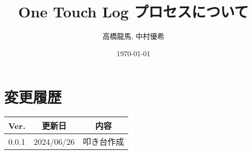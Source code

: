 \documentclass[a4paper,10pt,titlepage]{jreport}
\begin{document}
\title{One Touch Log プロセスについて}
\author{高橋龍馬, 中村優希}
\date{\today}
\maketitle

\section*{変更履歴}

\begin{longtable}[c]{|c|c|c|}
    \hline
        Ver. & 更新日 & 内容 \\
    \hline
    \endfirsthead
    \hline
        0.0.1 & 2024/06/26 & 叩き台作成 \\
    \hline
\end{longtable}

\newpage

\tableofcontents
\clearpage


\end{document}
